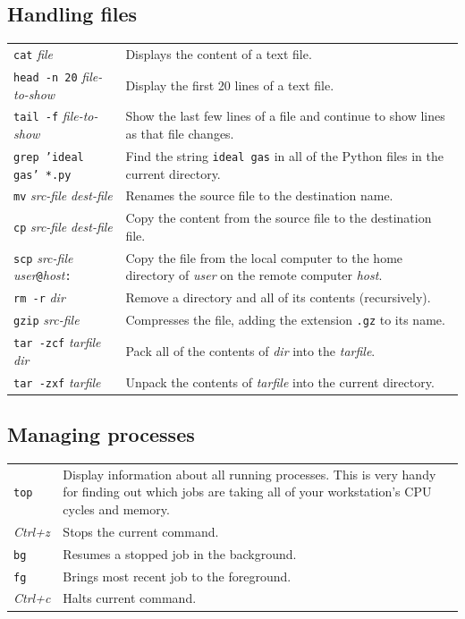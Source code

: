 \documentclass[12pt,a4paper,twoside]{article}
\begin{document}
\subsection*{Handling files}
\begin{tabular}{l|l}
 \texttt{cat} \textit{file} & Displays the content of a text file. \\
 \texttt{head -n 20} \textit{file-to-show} & Display the first 20 lines of a text file. \\
 \texttt{tail -f} \textit{file-to-show} & \parbox{0.6\textwidth}{Show the last few lines of a file and continue 
   to show lines as that file changes.} \\
 \texttt{grep 'ideal gas' *.py} & \parbox{0.6\textwidth}{Find the string \texttt{ideal gas} in all of 
   the Python files in the current directory.} \\
 \texttt{mv} \textit{src-file} \textit{dest-file} & Renames the source file to the destination name. \\
 \texttt{cp} \textit{src-file} \textit{dest-file} & Copy the content from the source file to the destination file. \\
 \texttt{scp} \textit{src-file} \textit{user}\texttt{@}\textit{host}\texttt{:} & \parbox{0.6\textwidth}{Copy the file
   from the local computer to the home directory of \textit{user} on the remote computer \textit{host}.} \\
 \texttt{rm -r} \textit{dir} & Remove a directory and all of its contents (recursively). \\
 \texttt{gzip} \textit{src-file} & Compresses the file, adding the extension \texttt{.gz} to its name. \\
 \texttt{tar -zcf} \textit{tarfile} \textit{dir} & Pack all of the contents of \textit{dir} into the \textit{tarfile}. \\
 \texttt{tar -zxf} \textit{tarfile} & Unpack the contents of \textit{tarfile} into the current directory. \\
\end{tabular}

\subsection*{Managing processes}
\begin{tabular}{l|l}
 \texttt{top} & \parbox{0.9\textwidth}{Display information about all running processes. This is very handy
   for finding out which jobs are taking all of your workstation's CPU cycles and memory.} \\
 \textit{Ctrl+z} & Stops the current command. \\
 \texttt{bg} & Resumes a stopped job in the background. \\
 \texttt{fg} & Brings most recent job to the foreground. \\
 \textit{Ctrl+c} & Halts current command. \\
\end{tabular}
\end{document}
